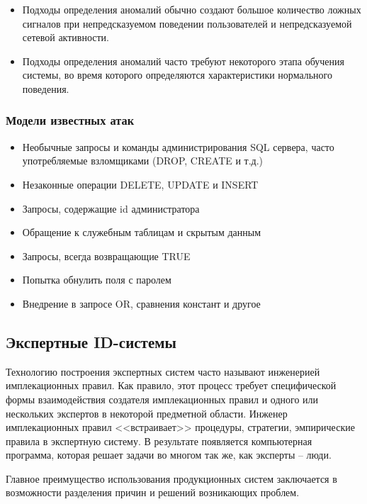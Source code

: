 \begin{itemize}
	\item Подходы определения аномалий обычно создают большое количество ложных сигналов 
	при непредсказуемом поведении пользователей и непредсказуемой сетевой активности.

	\item Подходы определения аномалий часто требуют некоторого этапа обучения системы, 
	во время которого определяются характеристики нормального поведения.
\end{itemize}



\subsubsection{Модели известных атак}

\begin{itemize}
	\item Необычные запросы и команды администрирования SQL сервера, часто употребляемые 
	взломщиками (DROP, CREATE и т.д.)
	\item Незаконные операции DELETE, UPDATE и INSERT
	\item Запросы, содержащие id администратора
	\item Обращение к служебным таблицам и скрытым данным
	\item Запросы, всегда возвращающие TRUE
	\item Попытка обнулить поля с паролем
	\item Внедрение в запросе OR, сравнения констант и другое
\end{itemize}



\subsection{Экспертные ID-системы}

Технологию построения экспертных систем часто называют инженерией имплекационных правил. Как правило, 
этот процесс требует специфической формы взаимодействия создателя имплекационных правил и одного 
или нескольких экспертов в некоторой предметной области. Инженер имплекационных правил <<встраивает>>
процедуры, стратегии, эмпирические правила в экспертную систему. В результате появляется 
компьютерная программа, которая решает задачи во многом так же, как эксперты -- люди.

Главное преимущество использования продукционных систем заключается в возможности разделения причин и 
решений возникающих проблем.

